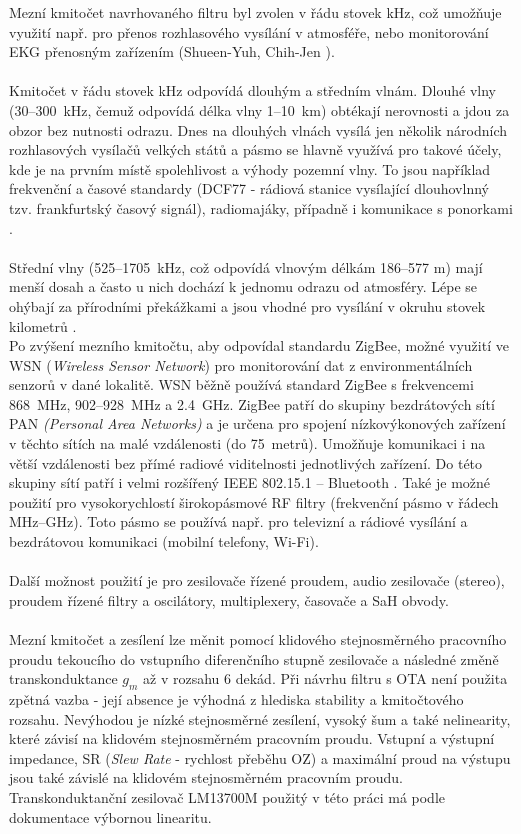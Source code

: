 Mezní kmitočet navrhovaného filtru byl zvolen v řádu stovek kHz, což umožňuje využití např. pro přenos rozhlasového vysílání v atmosféře, nebo monitorování EKG přenosným zařízením (Shueen-Yuh, Chih-Jen \cite{1}). \\ 
\\
Kmitočet v řádu stovek kHz odpovídá dlouhým a středním vlnám. Dlouhé vlny (30--300~kHz, čemuž odpovídá délka vlny 1--10~km) obtékají nerovnosti a jdou za obzor bez nutnosti odrazu. Dnes na dlouhých vlnách vysílá jen několik národních rozhlasových vysílačů velkých států a pásmo se hlavně využívá pro takové účely, kde je na prvním místě spolehlivost a výhody pozemní vlny. To jsou například frekvenční a časové standardy (DCF77 - rádiová stanice vysílající dlouhovlnný tzv. frankfurtský časový signál), radiomajáky, případně i komunikace s ponorkami \cite{2}. \\
\\
Střední vlny (525--1705~kHz, což odpovídá vlnovým délkám 186--577 m) mají menší dosah a často u nich dochází k jednomu odrazu od atmosféry. Lépe se ohýbají za přírodními překážkami a jsou vhodné pro vysílání v okruhu stovek kilometrů \cite{3}. \\
Po zvýšení mezního kmitočtu, aby odpovídal standardu ZigBee, možné využití ve WSN (\textit{Wireless Sensor Network}) pro monitorování dat z environmentálních senzorů v dané lokalitě. WSN běžně používá standard ZigBee s frekvencemi 868~MHz, 902–928~MHz a 2.4~GHz. ZigBee patří do skupiny bezdrátových sítí PAN \textit{(Personal Area Networks)} a je určena pro spojení nízkovýkonových zařízení v těchto sítích na malé vzdálenosti (do 75~metrů). Umožňuje komunikaci i na větší vzdálenosti bez přímé radiové viditelnosti jednotlivých zařízení. Do této skupiny sítí patří i velmi rozšířený IEEE 802.15.1 – Bluetooth \cite{4}. Také je možné použití pro vysokorychlostí širokopásmové RF filtry (frekvenční pásmo v řádech MHz--GHz). Toto pásmo se používá např. pro televizní a rádiové vysílání a bezdrátovou komunikaci (mobilní telefony, Wi-Fi). \\
\\
Další možnost použití je pro zesilovače řízené proudem, audio zesilovače (stereo), proudem řízené filtry a oscilátory, multiplexery, časovače a SaH obvody.\\
\\
Mezní kmitočet a zesílení lze měnit pomocí klidového stejnosměrného pracovního proudu tekoucího do vstupního diferenčního stupně zesilovače a následné změně transkonduktance $g_m$ až v rozsahu 6 dekád. Při návrhu filtru s OTA není použita zpětná vazba - její absence je výhodná z hlediska stability a kmitočtového rozsahu. Nevýhodou je nízké stejnosměrné zesílení, vysoký šum a také nelinearity, které závisí na klidovém stejnosměrném pracovním proudu. Vstupní a výstupní impedance, SR (\textit{Slew Rate} - rychlost přeběhu OZ) a maximální proud na výstupu jsou také závislé na klidovém stejnosměrném pracovním proudu. Transkonduktanční zesilovač LM13700M použitý v této práci má podle dokumentace výbornou linearitu.
